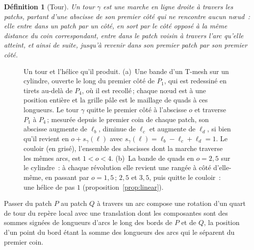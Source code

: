 \documentclass[11pt,a4paper]{article}
\newtheorem{definition}{Définition}
\newcommand{\shift}{s}
\begin{document}
\begin{definition}[Tour]
Un \emph{tour} $\gamma$ est une marche en ligne droite à travers les patchs,
partant d'une abscisse de son premier côté qui ne rencontre aucun nœud~: elle
entre dans un patch par un côté, en sort par le côté opposé à la même
distance du coin correspondant, entre dans le patch voisin à travers l'arc
qu'elle atteint, et ainsi de suite, jusqu'à revenir dans son premier patch
par son premier côté.
\end{definition}

\begin{figure}[t]
\centering

\caption{Un tour et l'hélice qu'il produit. (a)~Une bande d'un T-mesh sur un
cylindre, ouverte le long du premier côté de $P_1$, qui est redessiné en
tirets au-delà de $P_4$, où il est recollé\,; chaque nœud est à une position
entière et la grille pâle est le maillage de quads à ces longueurs. Le tour
$\gamma$ quitte le premier côté à l'abscisse $o$ et traverse $P_1$ à $P_4$\,;
mesurée depuis le premier coin de chaque patch, son abscisse augmente de
$\ell_b$, diminue de $\ell_c$ et augmente de $\ell_d$, si bien qu'il revient
en $o + \shift_\gamma(\ell)$ avec $\shift_\gamma(\ell) = \ell_b - \ell_c +
\ell_d = 1$. Le couloir (en grisé), l'ensemble des abscisses dont la marche
traverse les mêmes arcs, est $1 < o < 4$. (b)~La bande de quads en $o = 2,5$
sur le cylindre~: à chaque révolution elle revient une rangée à côté
d'elle-même, en passant par $o = 1,5$\,; $2,5$ et $3,5$, puis quitte le
couloir~: une hélice de pas $1$ (proposition~\ref{prop:linear}).}
\label{fig:turn}
\end{figure}

Passer du patch $P$ au patch $Q$ à travers un arc compose une rotation d'un
quart de tour du repère local avec une translation dont les composantes sont
des sommes signées de longueurs d'arcs le long des bords de $P$ et de $Q$,
la position d'un point du bord étant la somme des longueurs des arcs qui le
séparent du premier coin.
\end{document}
